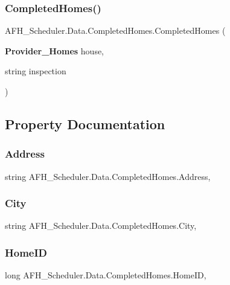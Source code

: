 \subsubsection{CompletedHomes()}
{\footnotesize\ttfamily A\+F\+H\+\_\+\+Scheduler.\+Data.\+Completed\+Homes.\+Completed\+Homes (\begin{DoxyParamCaption}\item[{\textbf{ Provider\+\_\+\+Homes}}]{house,  }\item[{string}]{inspection }\end{DoxyParamCaption})}



\subsection{Property Documentation}
\mbox{\label{class_a_f_h___scheduler_1_1_data_1_1_completed_homes_aad305a6ba268cad6fe573d1e30b1d1db}} 
\subsubsection{Address}
{\footnotesize\ttfamily string A\+F\+H\+\_\+\+Scheduler.\+Data.\+Completed\+Homes.\+Address\hspace{0.3cm}{\ttfamily [get]}, {\ttfamily [set]}}

\mbox{\label{class_a_f_h___scheduler_1_1_data_1_1_completed_homes_a0be595792b40b9b79a29105599226c36}} 
\subsubsection{City}
{\footnotesize\ttfamily string A\+F\+H\+\_\+\+Scheduler.\+Data.\+Completed\+Homes.\+City\hspace{0.3cm}{\ttfamily [get]}, {\ttfamily [set]}}

\mbox{\label{class_a_f_h___scheduler_1_1_data_1_1_completed_homes_a4812141a4cedf37ea1b8733a8ddfc7ce}} 
\subsubsection{HomeID}
{\footnotesize\ttfamily long A\+F\+H\+\_\+\+Scheduler.\+Data.\+Completed\+Homes.\+Home\+ID\hspace{0.3cm}{\ttfamily [get]}, {\ttfamily [set]}}

